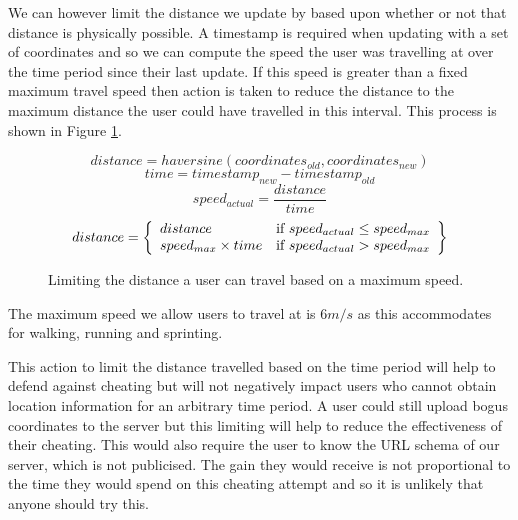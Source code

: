 We can however limit the distance we update by based upon whether or
not that distance is physically possible. A timestamp is required when
updating with a set of coordinates and so we can compute the speed the
user was travelling at over the time period since their last
update. If this speed is greater than a fixed maximum travel speed
then action is taken to reduce the distance to the maximum distance
the user could have travelled in this interval. This process is shown
in Figure \ref{fig:distance_limit}.

\begin{figure}[h]
\begin{equation*}
  distance = haversine(coordinates_{old}, coordinates_{new})
\end{equation*}
\begin{equation*}
  time = timestamp_{new} - timestamp_{old}
\end{equation*}
\begin{equation*}
  speed_{actual} = \frac{distance}{time}
\end{equation*}
\begin{equation*}
  distance = \left\{
  \begin{array}{l l}
    distance & \text{if $speed_{actual} \leq speed_{max}$} \\
    speed_{max} \times time & \text{if $speed_{actual} > speed_{max} $}
  \end{array}
  \right\}
\end{equation*}
\caption{Limiting the distance a user can travel based on a maximum speed.}
\label{fig:distance_limit}
\end{figure}

The maximum speed we allow users to travel at is $\text{6}m/s$ as this
accommodates for walking, running and sprinting.

This action to limit the distance travelled based on the time period
will help to defend against cheating but will not negatively impact
users who cannot obtain location information for an arbitrary time
period. A user could still upload bogus coordinates to the server but
this limiting will help to reduce the effectiveness of their
cheating. This would also require the user to know the URL schema of
our server, which is not publicised. The gain they would receive is
not proportional to the time they would spend on this cheating attempt
and so it is unlikely that anyone should try this.



